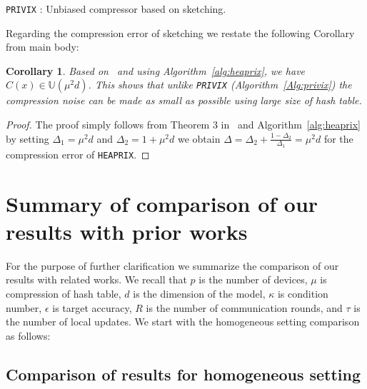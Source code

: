 \documentclass[twoside]{article}
\newtheorem{corollary}{Corollary}
\begin{document}
\begin{algorithm}[H]
\caption{\texttt{PRIVIX} \cite{li2019privacy}: Unbiased compressor based on sketching. }\label{Alg:privix}
\begin{algorithmic}[1]
\vspace{- 0.1cm}
\end{algorithmic}
\end{algorithm}



Regarding the compression error of sketching we restate the following Corollary from main body:
\begin{corollary}
Based on~\cite[Theorem 3]{horvath2020better} and using Algorithm~\ref{alg:heaprix}, we have $C(x)\in \mathbb{U}(\mu^2 d)$. This shows that unlike \texttt{PRIVIX} (Algorithm~\ref{Alg:privix}) the compression noise can be made as small as possible using large size of hash table.
\end{corollary}

\begin{proof}
The proof simply follows from Theorem 3 in~\cite{horvath2020better} and Algorithm~\ref{alg:heaprix} by setting $\Delta_1=\mu^2d$ and $\Delta_2=1+\mu^2d$ we obtain $\Delta=\Delta_2+\frac{1-\Delta_2}{\Delta_1}=\mu^2d$ for the compression error of \texttt{HEAPRIX}. 
\end{proof}


\section{Summary of comparison of our results with prior works}
For the purpose of further clarification we summarize the comparison of our results with related works. 
We recall that $p$ is the number of devices, $\mu$ is compression of hash table, $d$ is the dimension of the model, $\kappa$ is condition number, $\epsilon$ is target accuracy, $R$ is  the number of communication rounds, and $\tau$ is the number of local updates. 
We start with the homogeneous setting comparison as follows: 
\subsection{Comparison of results for  homogeneous setting}\label{sec:gen-proof}
\end{document}
